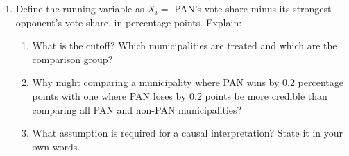 \documentclass[12pt]{article}
\begin{document}
\begin{enumerate}
\item Define the running variable as $X_i=$ PAN's vote share minus its strongest opponent's vote share, in percentage points. Explain:
\begin{enumerate}
\item What is the cutoff? Which municipalities are treated and which are the comparison group?
\vspace{1.8cm}
\item Why might comparing a municipality where PAN wins by 0.2 percentage points with one where PAN loses by 0.2 points be more credible than comparing all PAN and non-PAN municipalities?
\vspace{1.8cm}
\item What assumption is required for a causal interpretation? State it in your own words.
\vspace{1.8cm}
\end{enumerate}
\vspace{8ex}


\end{enumerate}
\end{document}
